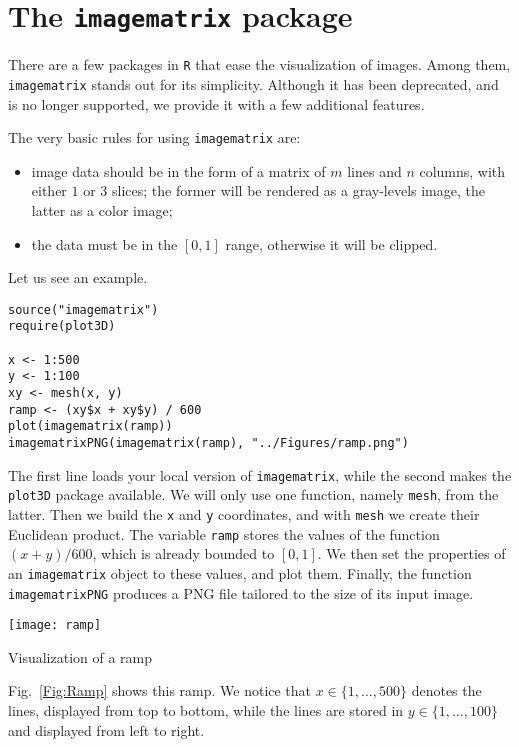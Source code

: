 \section{The \texttt{imagematrix} package}

There are a few packages in \verb|R| that ease the visualization of images.
Among them, \verb|imagematrix| stands out for its simplicity.
Although it has been deprecated, and is no longer supported, we provide it with a few additional features.

The very basic rules for using \verb|imagematrix| are:
\begin{itemize}
\item image data should be in the form of a matrix of $m$ lines and $n$ columns, with either $1$ or $3$ slices; the former will be rendered as a gray-levels image, the latter as a color image;
\item the data must be in the $[0,1]$ range, otherwise it will be clipped.
\end{itemize}

Let us see an example.
\lstset{numbers=left, numberstyle=\tiny, numberblanklines=false, numbersep=5pt}
\begin{lstlisting}[firstnumber=auto]
source("imagematrix")
require(plot3D)

x <- 1:500
y <- 1:100
xy <- mesh(x, y)
ramp <- (xy$x + xy$y) / 600
plot(imagematrix(ramp))
imagematrixPNG(imagematrix(ramp), "../Figures/ramp.png")
\end{lstlisting}

The first line loads your local version of \verb|imagematrix|, while the second makes the \verb|plot3D| package available.
We will only use one function, namely \verb|mesh|, from the latter.
Then we build the \verb|x| and \verb|y| coordinates, and with \verb|mesh| we create their Euclidean product.
The variable \verb|ramp| stores the values of the function $(x+y)/600$, which is already bounded to $[0,1]$.
We then set the properties of an \verb|imagematrix| object to these values, and plot them.
Finally, the function \verb|imagematrixPNG| produces a PNG file tailored to the size of its input image.

\begin{marginfigure}
\centering
\texttt{[image: ramp]}
\caption{Visualization of a ramp}\label{Fig:Ramp}
\end{marginfigure}

Fig.~\ref{Fig:Ramp} shows this ramp.
We notice that $x\in\{1,\dots,500\}$ denotes the lines, displayed from top to bottom,
while the lines are stored in $y\in\{1,\dots,100\}$ and displayed from left to right.


